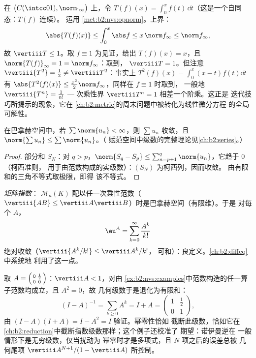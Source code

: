 \begin{example}[积分的算子范数]\label{ex:b2:nvs:integrationnorm}
在 $\bigl(C(\intcc01), \norm\cdot_\infty\bigr)$ 上，令 $T(f)(x) =
\int_0^x f(t)\,\dd t$（这是一个自同态：$T(f)$ 连续）。
运用 \cref{met:b2:nvs:opnorm}。上界：
\[
\abs{T(f)(x)} \leq \int_0^x\abs f \leq x\,\norm f_\infty \leq
\norm f_\infty ,
\]
故 $\vertiii T \leq 1$。取 $f \equiv 1$ 为见证，给出 $T(f)(x) =
x$，且 $\norm{T(f)}_\infty = 1 = \norm f_\infty$：取到，
$\vertiii T = 1$。但注意 $\vertiii{T^2} = \frac12 \neq
\vertiii T^2$：事实上 $T^2(f)(x) = \int_0^x(x - t)f(t)\dd t$ 有
$\abs{T^2(f)(x)} \leq \frac{x^2}2\norm f_\infty$，同样在 $f \equiv 1$ 时取到，
一般地 $\vertiii{T^n} = \frac1{n!}$ ---
次乘性界 $\vertiii T^n = 1$ 相差一个阶乘。这正是
迭代技巧所揭示的现象，它在
\cref{ch:b2:metric}的周末问题中被转化为线性微分方程
的全局可解性。
\end{example}

\begin{theorem}[巴拿赫空间中的绝对收敛]\label{thm:b2:nvs:absoluteconvergence}
在巴拿赫空间中，若 $\sum \norm{u_n} < \infty$，则 $\sum u_n$
收敛，且 $\norm{\sum u_n} \leq \sum\norm{u_n}$。（
赋范空间中级数的完整理论见\cref{ch:b2:series}。）
\end{theorem}

\begin{proof}
部分和 $S_N$：对 $q > p$，$\norm{S_q - S_p} \leq
\sum_{n=p+1}^{q}\norm{u_n}$，它趋于 $0$（柯西准则，
用于由范数构成的实级数）：$(S_N)$ 为柯西列，因而收敛。
由有限和的三角不等式取极限，即得
该不等式。
\end{proof}

\begin{example}[矩阵指数初探]\label{ex:b2:nvs:matrixexp}
\emph{矩阵指数}：
$\mathcal{M}_n(K)$ 配以任一次乘性范数（$\vertiii{AB}
\leq \vertiii A \vertiii B$）时是巴拿赫空间（有限维）。于是
对每个 $A$，
\[
\eu^A = \sum_{k=0}^{\infty} \frac{A^k}{k!}
\]
绝对收敛（$\vertiii{A^k/k!} \leq \vertiii A^k /k!$，
可和）：良定义。\cref{ch:b2:diffeq}中系统地
利用了这一点。
\end{example}

\begin{example}[终止的诺伊曼级数]\label{ex:b2:nvs:neumannfinite}
取 $A = \begin{psmallmatrix}0 & \frac12\\ 0 &
0\end{psmallmatrix}$：$\vertiii A < 1$，对由
\cref{ex:b2:nvs:examples}中范数构造的任一算子范数均成立，且 $A^2 = 0$，故
几何级数于是退化为有限和：
\[
(I - A)^{-1} = \sum_{k \geq 0} A^k = I + A =
\begin{pmatrix}1 & \tfrac12\\ 0 & 1\end{pmatrix},
\]
由 $(I - A)(I + A) = I - A^2 = I$ 验证。幂零性恰如
截断此级数，恰如它在
\cref{ch:b2:reduction}中截断指数级数那样；这个例子还校准了
期望：诺伊曼逆在
一般情形下是无穷级数，仅当扰动为
幂零时才是多项式，且 $N$ 项之后的误差总被
几何尾项 $\vertiii A^{N+1}/(1 - \vertiii A)$ 所控制。
\end{example}

